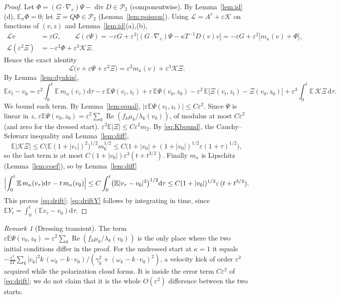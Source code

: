 \documentclass[11pt]{article}
\newcommand{\dd}{\mathrm{d}}
\newcommand{\E}{\mathbb{E}}
\newcommand{\eps}{\varepsilon}
\newcommand{\cL}{\mathcal{L}}
\newcommand{\cK}{\mathcal{K}}
\newcommand{\cP}{\mathcal{P}}
\renewcommand{\Re}{\operatorname{Re}}
\newcommand{\Div}{\operatorname{div}}
\theoremstyle{remark}
\newtheorem{remark}[theorem]{Remark}
\begin{document}
\begin{proof}
Let $\Phi=(G\cdot\nabla_v)\Psi-\Div D\in\cP_2$ (componentwise). By
Lemma~\ref{lem:id}(d), $\E_\pi\Phi=0$; let $\Xi=Q\Phi\in\cP_2$
(Lemma~\ref{lem:poisson}). Using $\cL=A^v+\eps\cK$ on functions of $(v,z)$
and Lemma~\ref{lem:id}(a),(b),
\begin{align*}
  \cL v&=\eps G,\qquad
  \cL(\eps\Psi)=-\eps G+\eps^2\bigl[(G\cdot\nabla_v)\Psi-\kappa T^{-1}D(v)v\bigr]
   =-\eps G+\eps^2\bigl[m_\kappa(v)+\Phi\bigr],\\
  \cL(\eps^2\Xi)&=-\eps^2\Phi+\eps^3\cK\Xi .
\end{align*}
Hence the exact identity
\begin{equation}
  \cL\bigl(v+\eps\Psi+\eps^2\Xi\bigr)=\eps^2m_\kappa(v)+\eps^3\cK\Xi .
  \label{eq:exactdrift}
\end{equation}
By Lemma~\ref{lem:dynkin},
\[
  \E v_t-v_0=\eps^2\!\int_0^t\!\E\,m_\kappa(v_\tau)\dd\tau
   -\eps\,\E\Psi(v_t,z_t)+\eps\,\E\Psi(v_0,z_0)
   -\eps^2\,\E\bigl[\Xi(v_t,z_t)-\Xi(v_0,z_0)\bigr]
   +\eps^3\!\int_0^t\!\E\,\cK\Xi\,\dd\tau .
\]
We bound each term. By Lemma~\ref{lem:equal}, $|\eps\E\Psi(v_t,z_t)|\le
C\eps^2$. Since $\Psi$ is linear in $z$,
$\eps\E\Psi(v_0,z_0)=\eps^2\sum_k\Re(f_k\mu_k/\lambda_k(v_0))$, of modulus
at most $C\eps^2$ (and zero for the dressed start). $\eps^2\E|\Xi|\le
C\eps^2m_2$. By \eqref{eq:Kbound}, the Cauchy--Schwarz inequality and
Lemma~\ref{lem:diff},
\[
  \E|\cK\Xi|\le C\bigl(\E(1+|v_\tau|)^2\bigr)^{1/2}m_6^{1/2}
  \le C\bigl(1+|v_0|+(1+|v_0|)^{1/2}\eps(1+\tau)^{1/2}\bigr),
\]
so the last term is at most $C(1+|v_0|)\eps^3(t+t^{3/2})$. Finally
$m_\kappa$ is Lipschitz (Lemma~\ref{lem:coef}), so by Lemma~\ref{lem:diff}
\[
  \Bigl|\int_0^t\E\,m_\kappa(v_\tau)\dd\tau-t\,m_\kappa(v_0)\Bigr|
  \le C\int_0^t\bigl(\E|v_\tau-v_0|^2\bigr)^{1/2}\dd\tau
  \le C(1+|v_0|)^{1/2}\eps\,(t+t^{3/2}).
\]
This proves \eqref{eq:drift}; \eqref{eq:driftY} follows by integrating in
time, since $\E Y_t=\int_0^t(\E v_\tau-v_0)\dd\tau$.
\end{proof}

\begin{remark}[Dressing transient]
The term $\eps\E\Psi(v_0,z_0)=\eps^2\sum_k\Re(f_k\mu_k/\lambda_k(v_0))$ is
the only place where the two initial conditions differ in the proof. For the
undressed start at $\kappa=1$ it equals
$-\frac{\eps^2}{2T}\sum_k|c_k|^2k\,
(\omega_k-k\cdot v_0)/(\gamma_k^2+(\omega_k-k\cdot v_0)^2)$, a velocity kick
of order $\eps^2$ acquired while the polarization cloud forms. It is inside
the error term $C\eps^2$ of \eqref{eq:drift}; we do not claim that it is the
whole $O(\eps^2)$ difference between the two starts.
\end{remark}
\end{document}
